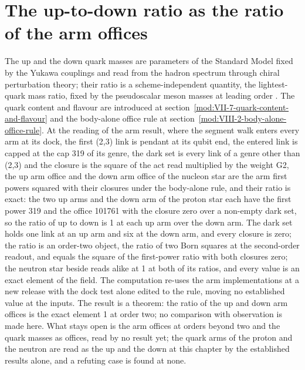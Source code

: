 \section{The up-to-down ratio as the ratio of the arm offices}\label{mod:VII-7-D539669-udao-t1}
The up and the down quark masses are parameters of the Standard Model fixed by the Yukawa couplings and read from the hadron spectrum through chiral perturbation theory; their ratio is a scheme-independent quantity, the lightest-quark mass ratio, fixed by the pseudoscalar meson masses at leading order \cite{Weinberg1977,Gasser1982}. The quark content and flavour are introduced at section~\ref{mod:VII-7-quark-content-and-flavour} and the body-alone office rule at section~\ref{mod:VIII-2-body-alone-office-rule}.
At the reading of the arm result, where the segment walk enters every arm at its dock, the first (2,3) link is pendant at its qubit end, the entered link is capped at the cap 319 of its genre, the dark set is every link of a genre other than (2,3) and the closure is the square of the act read multiplied by the weight G2, the up arm office and the down arm office of the nucleon star are the arm first powers squared with their closures under the body-alone rule, and their ratio is exact: the two up arms and the down arm of the proton star each have the first power 319 and the office 101761 with the closure zero over a non-empty dark set, so the ratio of up to down is 1 at each up arm over the down arm.
The dark set holds one link at an up arm and six at the down arm, and every closure is zero; the ratio is an order-two object, the ratio of two Born squares at the second-order readout, and equals the square of the first-power ratio with both closures zero; the neutron star beside reads alike at 1 at both of its ratios, and every value is an exact element of the field. The computation re-uses the arm implementations at a new release with the dock test alone edited to the rule, moving no established value at the inputs.
The result is a theorem: the ratio of the up and down arm offices is the exact element 1 at order two; no comparison with observation is made here.
What stays open is the arm offices at orders beyond two and the quark masses as offices, read by no result yet; the quark arms of the proton and the neutron are read as the up and the down at this chapter by the established results alone, and a refuting case is found at none.
\par\medskip{}\label{narr:close:7-7}\par
